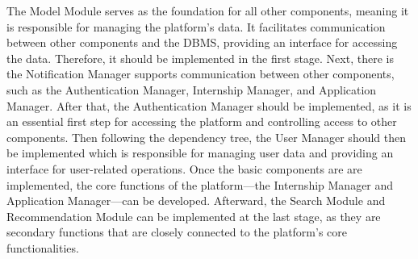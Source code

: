  The Model Module serves as the foundation for all other components, meaning it is responsible for managing the platform's data. It facilitates
 communication between other components and the DBMS, providing an interface for accessing the data. Therefore, it should be implemented in 
 the first stage. Next, there is the Notification Manager supports communication between other components, such as the Authentication Manager, 
 Internship Manager, and Application Manager. After that, the Authentication Manager should be implemented, as it is an essential first step 
 for accessing the platform and controlling access to other components. Then following the dependency tree, the User Manager should then be 
 implemented which is responsible for managing user data and providing an interface for user-related operations. Once the basic components are
 are implemented, the core functions of the platform—the Internship Manager and Application Manager—can be developed. Afterward, the Search 
 Module and Recommendation Module can be implemented at the last stage, as they are secondary functions that are closely connected to the 
 platform's core functionalities.

